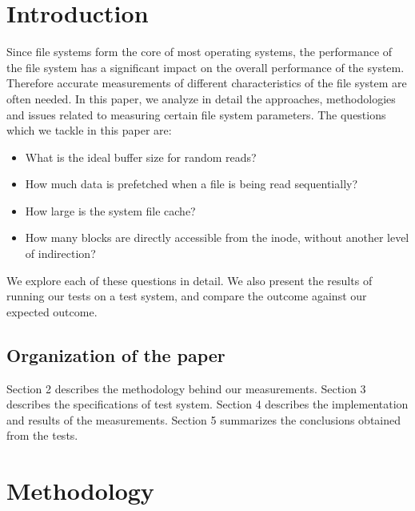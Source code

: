 \documentclass[twocolumn,11pt]{article}
\begin{document}
\begin{sloppypar}

\section{Introduction}
\label{sec:Introduction}

\noindent Since file systems form the core of most operating systems, the
performance of the file system has a significant impact on the overall
performance of the system. Therefore accurate measurements of different
characteristics of the file system are often needed. In this paper, we
analyze in detail the approaches, methodologies and issues related
to measuring certain file system parameters. The questions which we tackle
in this paper are:
\begin{itemize}
	\item What is the ideal buffer size for random reads?
	\item How much data is prefetched when a file is being read sequentially?
	\item How large is the system file cache?
	\item How many blocks are directly accessible from the inode, without
		another level of indirection?
\end{itemize}
We explore each of these questions in detail. We also present the results of
running our tests on a test system, and compare the outcome against our
expected outcome.

\subsection{Organization of the paper}
\noindent Section 2 describes the methodology behind our measurements. 
Section 3 describes the specifications of test system. Section 4 describes
the implementation and results of the measurements. Section 5 summarizes
the conclusions obtained from the tests.

\section{Methodology}
\label{sec:Methodology}


\end{sloppypar}
\end{document}
